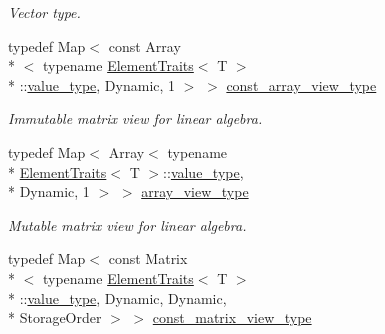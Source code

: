\begin{DoxyCompactItemize}
\begin{DoxyCompactList}\small\item\em Vector type. \end{DoxyCompactList}\item 
\hypertarget{class_d_o_1_1_multi_array_a4c4550c956b26060ca29852fc7752500}{typedef Map$<$ const Array\\*
$<$ typename \hyperlink{struct_d_o_1_1_element_traits}{Element\-Traits}$<$ T $>$\\*
\-::\hyperlink{class_d_o_1_1_multi_array_a265a253612b46abed17c61b0a5e5ce30}{value\-\_\-type}, Dynamic, 1 $>$ $>$ \hyperlink{class_d_o_1_1_multi_array_a4c4550c956b26060ca29852fc7752500}{const\-\_\-array\-\_\-view\-\_\-type}}\label{class_d_o_1_1_multi_array_a4c4550c956b26060ca29852fc7752500}

\begin{DoxyCompactList}\small\item\em Immutable matrix view for linear algebra. \end{DoxyCompactList}\item 
\hypertarget{class_d_o_1_1_multi_array_a9f4b00f1ddd01a394b9e7efc47206238}{typedef Map$<$ Array$<$ typename \\*
\hyperlink{struct_d_o_1_1_element_traits}{Element\-Traits}$<$ T $>$\-::\hyperlink{class_d_o_1_1_multi_array_a265a253612b46abed17c61b0a5e5ce30}{value\-\_\-type}, \\*
Dynamic, 1 $>$ $>$ \hyperlink{class_d_o_1_1_multi_array_a9f4b00f1ddd01a394b9e7efc47206238}{array\-\_\-view\-\_\-type}}\label{class_d_o_1_1_multi_array_a9f4b00f1ddd01a394b9e7efc47206238}

\begin{DoxyCompactList}\small\item\em Mutable matrix view for linear algebra. \end{DoxyCompactList}\item 
\hypertarget{class_d_o_1_1_multi_array_a6dcd1d235928f2209e19860122cfe407}{typedef Map$<$ const Matrix\\*
$<$ typename \hyperlink{struct_d_o_1_1_element_traits}{Element\-Traits}$<$ T $>$\\*
\-::\hyperlink{class_d_o_1_1_multi_array_a265a253612b46abed17c61b0a5e5ce30}{value\-\_\-type}, Dynamic, Dynamic, \\*
Storage\-Order $>$ $>$ \hyperlink{class_d_o_1_1_multi_array_a6dcd1d235928f2209e19860122cfe407}{const\-\_\-matrix\-\_\-view\-\_\-type}}\label{class_d_o_1_1_multi_array_a6dcd1d235928f2209e19860122cfe407}


\end{DoxyCompactItemize}
